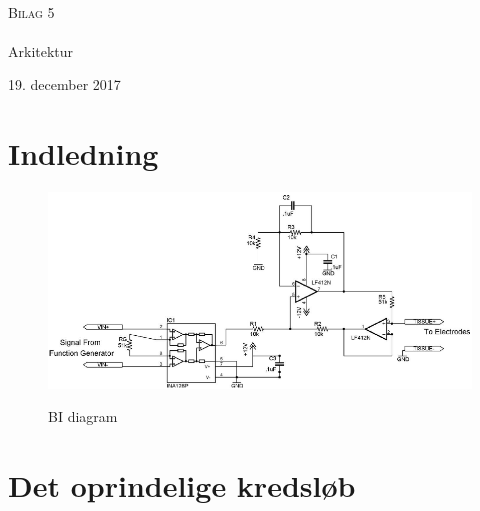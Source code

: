 \documentclass[main.tex]{subfiles}
\begin{document}
\begin{titlingpage}
\begin{center}

~ \\[3cm]


\textsc{\LARGE Bilag 5}\\[1.5cm]


\noindent\makebox[\linewidth]{\rule{\textwidth}{0.4pt}}\\
[0.5cm]{\Huge Arkitektur}
\noindent\makebox[\linewidth]{\rule{\textwidth}{0.4pt}}
\end{center}
\vfill
\begin{center}
{\large 19. december 2017}
\end{center}
\end{titlingpage}

\newpage
\tableofcontents*
\newpage

\chapter{Indledning}



\begin{figure}[H]
\centering
{\includegraphics[width=\linewidth]
{Figure/BIdiagram}}
\caption{BI diagram\cite{Aroom2009}}
\label{fig:BIdiagram}
\end{figure}






\chapter{Det oprindelige kredsløb}
\end{document}
